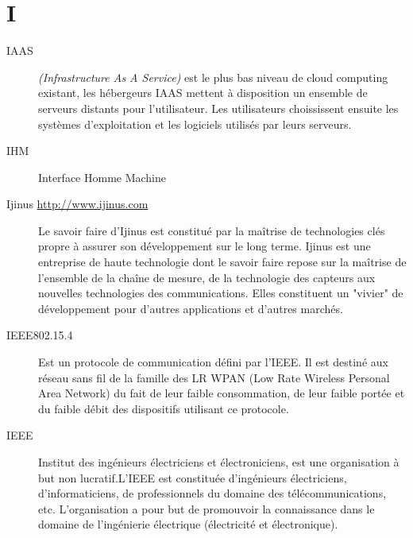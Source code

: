 \section{I}

\begin{description}

\item[IAAS] \textit{(Infrastructure As A Service)} est le plus bas niveau de cloud
 computing existant, les hébergeurs IAAS mettent à disposition un ensemble de serveurs
 distants pour l'utilisateur. Les utilisateurs choississent ensuite les systèmes d'exploitation
 et les logiciels utilisés par leurs serveurs. 
 
\item[IHM] Interface Homme Machine

\item[Ijinus \url{http://www.ijinus.com}]
 Le savoir faire d’Ijinus est constitué par la maîtrise de technologies 
 clés propre à assurer son développement sur le long terme.
Ijinus est une entreprise de haute technologie dont le savoir faire repose sur 
la maîtrise de l’ensemble de la chaîne de mesure, de la technologie des capteurs 
aux nouvelles technologies des communications.
Elles constituent un "vivier" de développement pour d'autres applications et 
d'autres marchés.

\item[IEEE802.15.4]
 Est un protocole de communication défini par l'IEEE. Il est destiné aux réseau 
 sans fil de la famille des LR WPAN (Low Rate Wireless Personal Area Network) 
 du fait de leur faible consommation, de leur faible portée et du faible débit 
 des dispositifs utilisant ce protocole.

\item[IEEE]
Institut des ingénieurs électriciens et électroniciens, est une organisation à 
but non lucratif.L’IEEE est constituée d’ingénieurs électriciens, 
d’informaticiens, de professionnels du domaine des télécommunications, etc. 
L’organisation a pour but de promouvoir la connaissance dans le domaine de 
l’ingénierie électrique (électricité et électronique).

\end{description}

